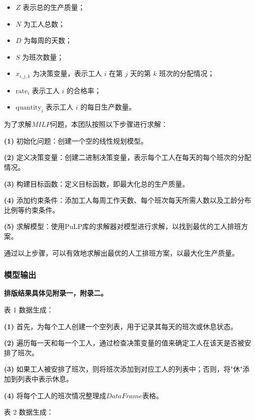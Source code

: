 \documentclass[withoutpreface,bwprint]{cumcmthesis}
\begin{document}
\begin{itemize}

    \item \( Z \) 表示总的生产质量；
    \item \( N \) 为工人总数；
    \item \( D \) 为每周的天数；
    \item \( S \) 为班次数量；
    \item \( x_{i,j,k}\) 为决策变量，表示工人 \( i \) 在第 \( j \) 天的第 \( k \) 班次的分配情况；
    \item \(\text{rate}_{i} \) 表示工人 \( i \) 的合格率；
    \item \(\text{quantity}_{i} \) 表示工人 \( i \) 的每日生产数量。
    
\end{itemize}

\vspace{12pt}
为了求解\(MILP\)问题，本团队按照以下步骤进行求解：

\textbf{(1)} 初始化问题：创建一个空的线性规划模型。

\textbf{(2)} 定义决策变量：创建二进制决策变量，表示每个工人在每天的每个班次的分配情况。

\textbf{(3)} 构建目标函数：定义目标函数，即最大化总的生产质量。

\textbf{(4)} 添加约束条件：添加工人每周工作天数、每个班次每天所需人数以及工龄分布比例等约束条件。

\textbf{(5)} 求解模型：使用PuLP库的求解器对模型进行求解，以找到最优的工人排班方案。

通过以上步骤，可以有效地求解出最优的人工排班方案，以最大化生产质量。

\subsubsection{模型输出}

\textbf{排版结果具体见附录一，附录二。}

表 1 数据生成：

\textbf{(1)} 首先，为每个工人创建一个空列表，用于记录其每天的班次或休息状态。

\textbf{(2)} 遍历每一天和每一个工人，通过检查决策变量的值来确定工人在该天是否被安排了班次。

\textbf{(3)} 如果工人被安排了班次，则将班次添加到对应工人的列表中；否则，将"休"添加到列表中表示休息。

\textbf{(4)} 将每个工人的班次情况整理成\(DataFrame\)表格。

\vspace{12pt}
表 2 数据生成：
\end{document}
